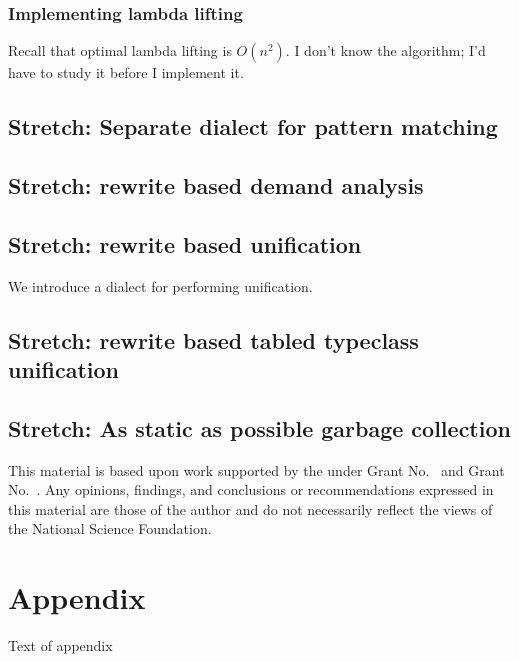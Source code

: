 \documentclass[sigplan,\review anonymous]{acmart}
\begin{document}
\subsubsection{Implementing lambda lifting}
Recall that optimal lambda lifting is $O(n^2)$. I don't know the
algorithm; I'd have to study it before I implement it.

\subsection{Stretch: Separate dialect for pattern matching}
\subsection{Stretch: rewrite based demand analysis}
\subsection{Stretch: rewrite based unification}
We introduce a dialect for performing unification.


\subsection{Stretch: rewrite based tabled typeclass unification}
\subsection{Stretch: As static as possible garbage collection}


\begin{acks}                            %
  This material is based upon work supported by the
   under Grant
  No.~ and Grant
  No.~.  Any opinions, findings, and
  conclusions or recommendations expressed in this material are those
  of the author and do not necessarily reflect the views of the
  National Science Foundation.
\end{acks}




\appendix
\section{Appendix}

Text of appendix
\end{document}
